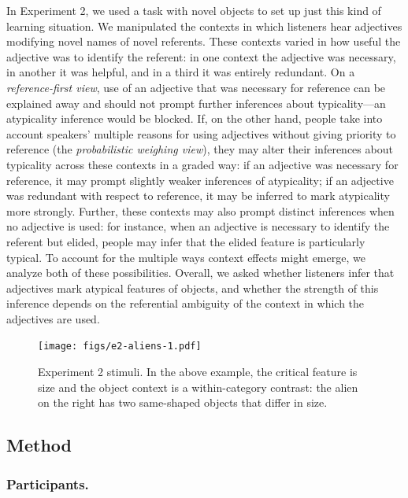 \documentclass[
  english,
  man,floatsintext]{apa6}
\begin{document}
In Experiment 2, we used a task with novel objects to set up just this kind of learning situation. We manipulated the contexts in which listeners hear adjectives modifying novel names of novel referents. These contexts varied in how useful the adjective was to identify the referent: in one context the adjective was necessary, in another it was helpful, and in a third it was entirely redundant. On a \emph{reference-first view}, use of an adjective that was necessary for reference can be explained away and should not prompt further inferences about typicality---an atypicality inference would be blocked. If, on the other hand, people take into account speakers' multiple reasons for using adjectives without giving priority to reference (the \emph{probabilistic weighing view}), they may alter their inferences about typicality across these contexts in a graded way: if an adjective was necessary for reference, it may prompt slightly weaker inferences of atypicality; if an adjective was redundant with respect to reference, it may be inferred to mark atypicality more strongly. Further, these contexts may also prompt distinct inferences when no adjective is used: for instance, when an adjective is necessary to identify the referent but elided, people may infer that the elided feature is particularly typical. To account for the multiple ways context effects might emerge, we analyze both of these possibilities. Overall, we asked whether listeners infer that adjectives mark atypical features of objects, and whether the strength of this inference depends on the referential ambiguity of the context in which the adjectives are used.

\begin{figure}
\centering
\texttt{[image: figs/e2-aliens-1.pdf]}
\caption{\label{fig:e2-aliens}Experiment 2 stimuli. In the above example, the critical feature is size and the object context is a within-category contrast: the alien on the right has two same-shaped objects that differ in size.}
\end{figure}

\hypertarget{method-1}{%
\subsection{Method}\label{method-1}}

\hypertarget{participants.-1}{%
\subsubsection{Participants.}\label{participants.-1}}
\end{document}
